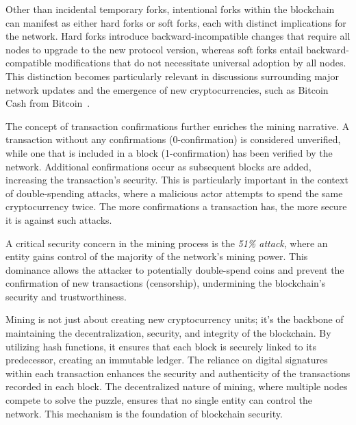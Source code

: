 Other than incidental temporary forks, intentional forks within the blockchain can manifest as either hard forks or soft forks, each with distinct implications for the network. Hard forks introduce backward-incompatible changes that require all nodes to upgrade to the new protocol version, whereas soft forks entail backward-compatible modifications that do not necessitate universal adoption by all nodes. This distinction becomes particularly relevant in discussions surrounding major network updates and the emergence of new cryptocurrencies, such as Bitcoin Cash from Bitcoin~\cite{bitcoincashabcFork}.

The concept of transaction confirmations further enriches the mining narrative. A transaction without any confirmations (0-confirmation) is considered unverified, while one that is included in a block (1-confirmation) has been verified by the network. Additional confirmations occur as subsequent blocks are added, increasing the transaction's security. This is particularly important in the context of double-spending attacks, where a malicious actor attempts to spend the same cryptocurrency twice. The more confirmations a transaction has, the more secure it is against such attacks.

A critical security concern in the mining process is the \textit{51\% attack}, where an entity gains control of the majority of the network's mining power. This dominance allows the attacker to potentially double-spend coins and prevent the confirmation of new transactions (censorship), undermining the blockchain's security and trustworthiness.

Mining is not just about creating new cryptocurrency units; it's the backbone of maintaining the decentralization, security, and integrity of the blockchain. By utilizing hash functions, it ensures that each block is securely linked to its predecessor, creating an immutable ledger. The reliance on digital signatures within each transaction enhances the security and authenticity of the transactions recorded in each block. The decentralized nature of mining, where multiple nodes compete to solve the puzzle, ensures that no single entity can control the network. This mechanism is the foundation of blockchain security.


